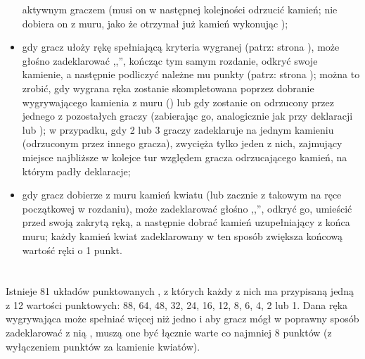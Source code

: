 \begin{itemize}
  aktywnym graczem (musi on w następnej kolejności odrzucić kamień; nie dobiera
  on z muru, jako że otrzymał już kamień wykonując );
  \item {}
  gdy gracz ułoży rękę spełniającą kryteria wygranej (patrz: strona
  \pageref{wygrywajacareka}), może głośno zadeklarować ,,'', kończąc
  tym samym rozdanie, odkryć swoje kamienie, a następnie podliczyć należne mu punkty
  (patrz: strona \pageref{punktacja}); można to zrobić, gdy wygrana ręka
  zostanie skompletowana poprzez dobranie wygrywającego kamienia z muru
  () lub gdy zostanie on odrzucony przez jednego z pozostałych
  graczy (zabierając go, analogicznie jak przy deklaracji  lub
  ); w przypadku, gdy 2 lub 3 graczy zadeklaruje  na
  jednym kamieniu (odrzuconym przez innego gracza), zwycięża tylko jeden z nich,
  zajmujący miejsce najbliższe w kolejce tur względem gracza odrzucającego
  kamień, na którym padły deklaracje;
  \item {}
  gdy gracz dobierze z muru kamień kwiatu (lub zacznie z takowym na ręce
  początkowej w rozdaniu), może zadeklarować głośno ,,'', odkryć
  go, umieścić przed swoją zakrytą ręką, a następnie dobrać kamień uzupełniający
  z końca muru; każdy kamień kwiat zadeklarowany w ten sposób zwiększa końcową
  wartość ręki o 1 punkt.
\end{itemize}

\section{}
\label{fan}
Istnieje 81 układów punktowanych , z których każdy z nich ma
przypisaną jedną z 12 wartości punktowych: 88, 64, 48, 32, 24, 16, 12, 8, 6, 4,
2 lub 1. Dana ręka
wygrywająca może spełniać więcej niż jedno  i aby gracz mógł w
poprawny sposób zadeklarować z nią , muszą one być łącznie warte co
najmniej 8 punktów (z wyłączeniem punktów za kamienie kwiatów).


